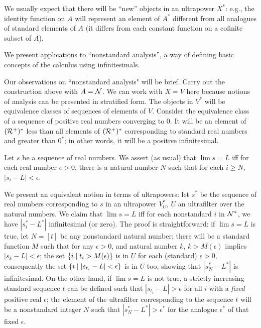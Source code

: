 We usually expect that there will be ``new'' objects in an ultrapower
$X^*$: e.g., the identity function on $A$ will represent an element of
$A^*$ different from all analogues of standard elements of $A$ (it
differs from each constant function on a cofinite subset of
$A$).

We present applications to ``nonstandard analysis'', a way of defining
basic concepts of the calculus using infinitesimals.

Our observations on ``nonstandard analysis" will be brief.  Carry out
the construction above with $A = {\cal N}$. We can work with $X=V$
here because notions of analysis can be presented in
stratified form. The objects in $V^*$ will be equivalence
classes of
sequences of elements of $V$.  Consider the equivalence class
of a sequence of positive real numbers converging to 0.  It
will be an element of $({\cal R^+})^*$ less than all elements of $({\cal
R}^+)^*$ 
corresponding to standard real numbers and greater than $0^*$; in
other words, it will be a positive infinitesimal.

Let $s$ be a sequence of real numbers.  We assert (as usual) that
$\lim s = L$ iff for each real number $\epsilon>0$, there is a
natural 
number $N$ such that for each $i \geq N$, $|s_i-L| < \epsilon$.

We present an equivalent notion in terms of ultrapowers: let $s^*$ be
the sequence of real numbers corresponding to $s$ in an ultrapower
$V^*_U$, $U$ an ultrafilter over the natural numbers.  We
claim that 
$\lim s = L$ iff for each nonstandard $i$ in ${\cal N}^*$, we have
$|s^*_i-L^*|$ infinitesimal (or zero).  The proof is
straightforward: 
if $\lim s = L$ is true, let $N = [t]$ be any nonstandard natural
number; there will be a standard function $M$ such that for any
$\epsilon > 0$, and natural number $k$, $k > M(\epsilon)$ implies
$|s_k - L| < \epsilon$; the set $\{i \mid t_i > M(\epsilon)\}$ is in
$U$ for each (standard) $\epsilon > 0$, consequently the set $\{i \mid
|s_{t_i} - L| <
\epsilon\}$ is in $U$ too, showing that $|s^*_N-L^*|$ is
infinitesimal. 
On the other hand, if $\lim s = L$ is not true, a strictly increasing
standard sequence $t$ can be defined such that
$|s_{t_i}-L|>\epsilon$ 
for all $i$ with a {\itshape fixed\/} positive real
$\epsilon$; the element of the ultrafilter corresponding to the sequence $t$
will be a nonstandard integer $N$ such that $|s^*_N-L^*| > \epsilon^*$ for the
analogue $\epsilon^*$ of that fixed $\epsilon$.

